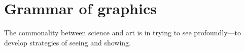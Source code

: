 \documentclass[krantz2]{krantz}\usepackage{knitr}%
\begin{document}

\frontmatter

\maketitle


\setcounter{page}{7} %
\tableofcontents
%

\listoffigures
\listoftables
%
%

\mainmatter





















\chapter{Grammar of graphics}\label{chap:R:plotting}

\begin{VF}
The commonality between science and art is in trying to see profoundly---to develop strategies of seeing and showing.

\end{VF}
\end{document}
